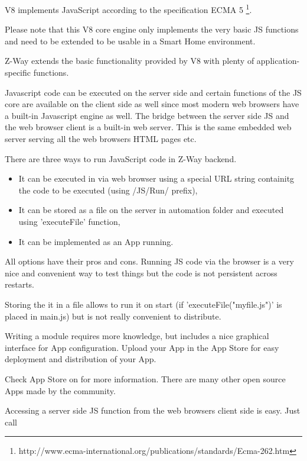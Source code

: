 
V8 implements JavaScript according to the specification ECMA 5
\footnote {http://www.ecma-international.org/publications/standards/Ecma-262.htm}.

Please note that this V8 core engine only implements the very basic JS functions and need to 
be extended to be usable in a Smart Home environment.

Z-Way extends the basic functionality provided by V8 with plenty of application-specific functions.

Javascript code can be executed on the server side and certain functions of the JS core are 
available on the client side as well since most modern web browsers have a built-in Javascript
engine as well. The bridge between the server side JS and the web browser client is a built-in
web server. This is the same embedded web server serving all the web browsers HTML pages etc.

There are three ways to run JavaScript code in Z-Way backend.
\begin{itemize}
\item It can be executed in via web browser using a special URL string containitg the code to be executed (using /JS/Run/ prefix),
\item It can be stored as a file on the server in automation folder and executed using 'executeFile' function,
\item It can be implemented as an App running.
\end{itemize}

All options have their pros and cons. Running JS code via the browser is a very nice and convenient way to test things but the code is not persistent across \zway restarts.

Storing the it in a file allows to run it on \zway start (if 'executeFile("myfile.js")' is placed in main.js) but is not really convenient to distribute.

Writing a module requires more knowledge, but includes a nice graphical interface for App configuration. Upload your App in the \zway App Store for easy deployment and distribution of your App.

Check \zway App Store on  for more information. There are many other open source Apps made by the community.

Accessing a server side JS function from the web browsers client side is easy. Just call 



